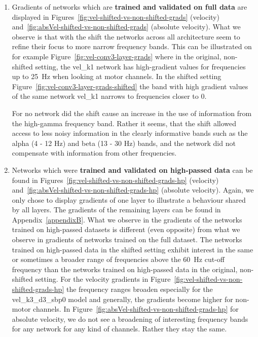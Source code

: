 \begin{enumerate}
    \item Gradients of networks which are \textbf{trained and validated on full data} are displayed in Figures~\ref{fig:vel-shifted-vs-non-shifted-grads} (velocity) and~\ref{fig:absVel-shifted-vs-non-shifted-grads} (absolute velocity).
    What we observe is that with the shift the networks across all architecture seem to refine their focus to more narrow frequency bands.
    This can be illustrated on for example Figure~\ref{fig:vel-conv3-layer-grads} where in the original, non-shifted setting, the vel\_k1 network has high-gradient values for frequencies up to 25~Hz when looking at motor channels.
    In the shifted setting Figure~\ref{fig:vel-conv3-layer-grads-shifted} the band with high gradient values of the same network vel\_k1 narrows to frequencies closer to 0.
    
    For no network  did the shift cause an increase in the use of information from the high-gamma frequency band.
    Rather it seems, that the shift allowed access to less noisy information in the clearly informative bands such as the alpha (4 - 12 Hz) and beta (13 - 30 Hz) bands, and the network did not compensate with information from other frequencies.
    
    \item Networks which were \textbf{trained and validated on high-passed data} can be found in Figures~\ref{fig:vel-shifted-vs-non-shifted-grads-hp} (velocity) and~\ref{fig:absVel-shifted-vs-non-shifted-grads-hp} (absolute velocity).
    Again, we only chose to display gradients of one layer to illustrate a behaviour shared by all layers.
    The gradients of the remaining layers can be found in Appendix~\ref{appendixB}.
    What we observe in the gradients of the networks trained on high-passed datasets is different (even opposite) from what we observe in gradients of networks trained on the full dataset.
    The networks trained on high-passed data in the shifted setting exhibit interest in the same or sometimes a broader range of frequencies above the 60~Hz cut-off frequency than the networks trained on high-passed data in the original, non-shifted setting. 
    For the velocity gradients in Figure~\ref{fig:vel-shifted-vs-non-shifted-grads-hp} the frequency ranges broaden especially for the vel\_k3\_d3\_sbp0 model and generally, the gradients become higher for non-motor channels.
    In Figure~\ref{fig:absVel-shifted-vs-non-shifted-grads-hp} for absolute velocity, we do not see a broadening of interesting frequency bands for any network for any kind of channels. Rather they stay the same.
    

\end{enumerate}
